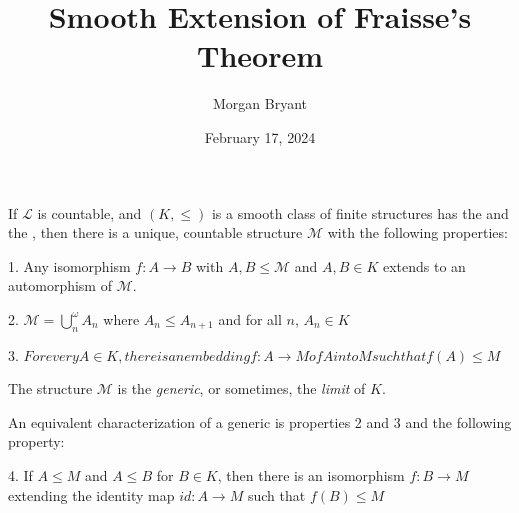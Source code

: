 \documentclass[a4paper]{article}
\title{Smooth Extension of Fraisse's Theorem}
\date{February 17, 2024}
\author{Morgan Bryant}
\begin{document}
\maketitle
\par{If \(\mathcal {L}\) is countable, and \((K, \leq )\) is a smooth class of finite structures has the  and the , 
then there is a unique, countable structure \(\mathcal {M}\)  with the following properties:}\par{1. Any isomorphism \(f:A \rightarrow  B\) with \(A,B \leq   \mathcal {M}\) and \(A,B \in  K\) extends to
an automorphism of \(\mathcal {M}\).}\par{2. \(\mathcal {M} =  \bigcup ^ \omega _n A_n\) where \(A_n  \leq  A_{n+1}\) and for all \(n\), \(A_n \in  K\)}\par{3. \(For every  A \in  K , there is an embedding  f:A \rightarrow  M  of  A  into  M  such that  f(A)  \leq  M\)}\par{The structure \(\mathcal {M}\) is the \emph{generic}, or sometimes, the \emph{limit} of \(K\).}\par{An equivalent characterization of a generic is properties 2 and 3 and the following property:}\par{4. If \(A \leq  M\) and \(A \leq  B\) for \(B \in  K\), then there is an isomorphism \(f: B \rightarrow  M\) extending the identity map \(id: A \rightarrow  M\) 
such that \(f(B)  \leq  M\)}
\printbibliography
\end{document}

